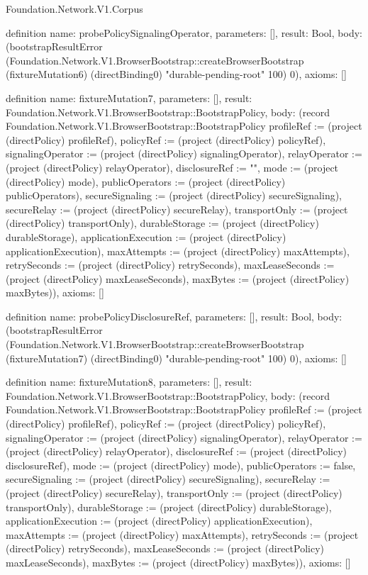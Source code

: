 \begin{lexlean}{Foundation.Network.V1.Corpus}
\begin{semanticmodule}
definition{
  name: probePolicySignalingOperator,
  parameters: [],
  result: Bool,
  body: (bootstrapResultError (Foundation.Network.V1.BrowserBootstrap::createBrowserBootstrap (fixtureMutation6) (directBinding0) "durable-pending-root" 100) 0),
  axioms: []
}

definition{
  name: fixtureMutation7,
  parameters: [],
  result: Foundation.Network.V1.BrowserBootstrap::BootstrapPolicy,
  body: (record Foundation.Network.V1.BrowserBootstrap::BootstrapPolicy {profileRef := (project (directPolicy) profileRef), policyRef := (project (directPolicy) policyRef), signalingOperator := (project (directPolicy) signalingOperator), relayOperator := (project (directPolicy) relayOperator), disclosureRef := "", mode := (project (directPolicy) mode), publicOperators := (project (directPolicy) publicOperators), secureSignaling := (project (directPolicy) secureSignaling), secureRelay := (project (directPolicy) secureRelay), transportOnly := (project (directPolicy) transportOnly), durableStorage := (project (directPolicy) durableStorage), applicationExecution := (project (directPolicy) applicationExecution), maxAttempts := (project (directPolicy) maxAttempts), retrySeconds := (project (directPolicy) retrySeconds), maxLeaseSeconds := (project (directPolicy) maxLeaseSeconds), maxBytes := (project (directPolicy) maxBytes)}),
  axioms: []
}

definition{
  name: probePolicyDisclosureRef,
  parameters: [],
  result: Bool,
  body: (bootstrapResultError (Foundation.Network.V1.BrowserBootstrap::createBrowserBootstrap (fixtureMutation7) (directBinding0) "durable-pending-root" 100) 0),
  axioms: []
}

definition{
  name: fixtureMutation8,
  parameters: [],
  result: Foundation.Network.V1.BrowserBootstrap::BootstrapPolicy,
  body: (record Foundation.Network.V1.BrowserBootstrap::BootstrapPolicy {profileRef := (project (directPolicy) profileRef), policyRef := (project (directPolicy) policyRef), signalingOperator := (project (directPolicy) signalingOperator), relayOperator := (project (directPolicy) relayOperator), disclosureRef := (project (directPolicy) disclosureRef), mode := (project (directPolicy) mode), publicOperators := false, secureSignaling := (project (directPolicy) secureSignaling), secureRelay := (project (directPolicy) secureRelay), transportOnly := (project (directPolicy) transportOnly), durableStorage := (project (directPolicy) durableStorage), applicationExecution := (project (directPolicy) applicationExecution), maxAttempts := (project (directPolicy) maxAttempts), retrySeconds := (project (directPolicy) retrySeconds), maxLeaseSeconds := (project (directPolicy) maxLeaseSeconds), maxBytes := (project (directPolicy) maxBytes)}),
  axioms: []
}


\end{semanticmodule}
\end{lexlean}
